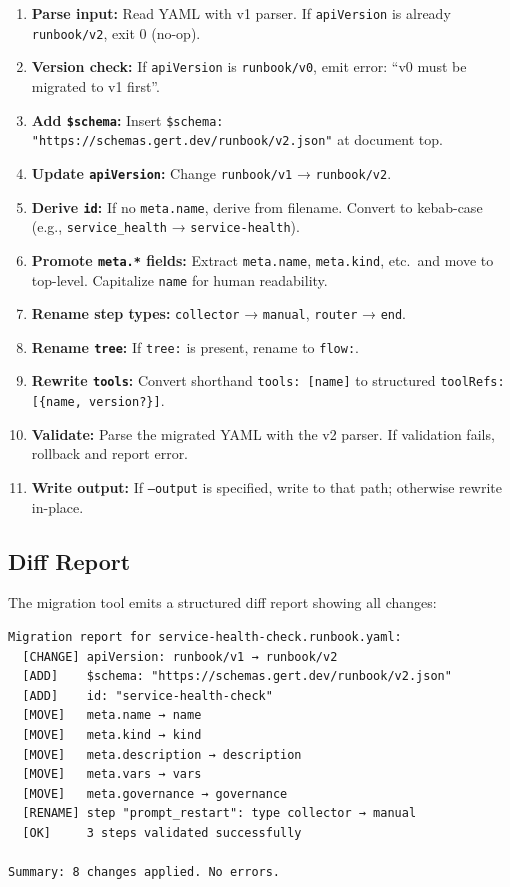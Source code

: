 \begin{enumerate}
  \item \textbf{Parse input:} Read YAML with v1 parser. If \texttt{apiVersion} is already \texttt{runbook/v2}, exit 0 (no-op).
  \item \textbf{Version check:} If \texttt{apiVersion} is \texttt{runbook/v0}, emit error: ``v0 must be migrated to v1 first''.
  \item \textbf{Add \texttt{\$schema}:} Insert \texttt{\$schema: "https://schemas.gert.dev/runbook/v2.json"} at document top.
  \item \textbf{Update \texttt{apiVersion}:} Change \texttt{runbook/v1} → \texttt{runbook/v2}.
  \item \textbf{Derive \texttt{id}:} If no \texttt{meta.name}, derive from filename. Convert to kebab-case (e.g., \texttt{service\_health} → \texttt{service-health}).
  \item \textbf{Promote \texttt{meta.*} fields:} Extract \texttt{meta.name}, \texttt{meta.kind}, etc.\ and move to top-level. Capitalize \texttt{name} for human readability.
  \item \textbf{Rename step types:} \texttt{collector} → \texttt{manual}, \texttt{router} → \texttt{end}.
  \item \textbf{Rename \texttt{tree}:} If \texttt{tree:} is present, rename to \texttt{flow:}.
  \item \textbf{Rewrite \texttt{tools}:} Convert shorthand \texttt{tools: [name]} to structured \texttt{toolRefs: [\{name, version?\}]}.
  \item \textbf{Validate:} Parse the migrated YAML with the v2 parser. If validation fails, rollback and report error.
  \item \textbf{Write output:} If \texttt{--output} is specified, write to that path; otherwise rewrite in-place.
\end{enumerate}

\subsection{Diff Report}

The migration tool emits a structured diff report showing all changes:

\begin{verbatim}
Migration report for service-health-check.runbook.yaml:
  [CHANGE] apiVersion: runbook/v1 → runbook/v2
  [ADD]    $schema: "https://schemas.gert.dev/runbook/v2.json"
  [ADD]    id: "service-health-check"
  [MOVE]   meta.name → name
  [MOVE]   meta.kind → kind
  [MOVE]   meta.description → description
  [MOVE]   meta.vars → vars
  [MOVE]   meta.governance → governance
  [RENAME] step "prompt_restart": type collector → manual
  [OK]     3 steps validated successfully

Summary: 8 changes applied. No errors.
\end{verbatim}


